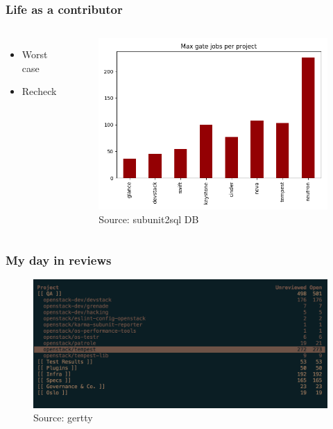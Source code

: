 \documentclass[aspectratio=169,11pt,hyperref={colorlinks=true}]{beamer}
\begin{document}
\begin{frame}
    \frametitle{Life as a contributor}
       \begin{columns}
    \begin{itemize}
        \item{Worst case}
        \item{Recheck}
    \end{itemize}
    \begin{figure}
            \centering
            \includegraphics[width=1\textwidth]{max_job_per_changes.png}
            \caption{Source: subunit2sql DB}
    \end{figure}
       \end{columns}
\end{frame}


\begin{frame}
    \frametitle{My day in reviews}
    \begin{figure}
    \begin{center}
         \includegraphics[width=1\textwidth]{pending_reviews.png}
         \caption{Source: gertty}
    \end{center}
    \end{figure}
\end{frame}
\end{document}
